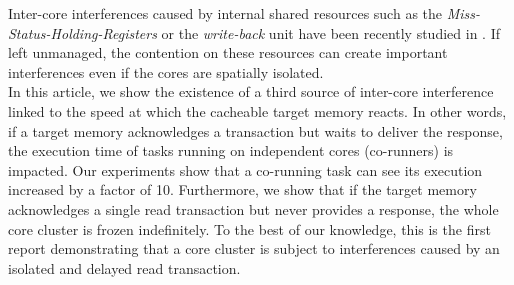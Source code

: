     Inter-core interferences caused by internal shared resources such as the \emph{Miss-Status-Holding-Registers} or the \emph{write-back} unit have been recently studied in \cite{Valsan2017AddressingIC, Heechul_DDOS_attacks_on_shared_cache}.
    If left unmanaged, the contention on these resources can create important interferences even if the cores are spatially isolated.\\

    In this article, we show the existence of a third source of inter-core interference linked to the speed at which the cacheable target memory reacts.
    In other words, if a target memory acknowledges a transaction but waits to deliver the response, the execution time of tasks running on independent cores (co-runners) is impacted.
    Our experiments show that a co-running task can see its execution increased by a factor of 10.
    Furthermore, we show that if the target memory acknowledges a single read transaction but never provides a response, the whole core cluster is frozen indefinitely.
    To the best of our knowledge, this is the first report demonstrating that a core cluster is subject to interferences caused by an isolated and delayed read transaction.
